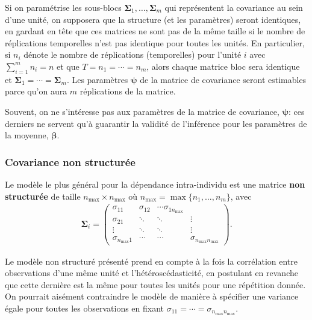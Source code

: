 \documentclass[
  11pt,
  letterpaper,
]{article}
\theoremstyle{definition}
\theoremstyle{definition}
\theoremstyle{definition}
\theoremstyle{definition}
\theoremstyle{remark}
\begin{document}
Si on paramétrise les sous-blocs \(\boldsymbol{\Sigma}_1, \ldots, \boldsymbol{\Sigma}_m\) qui représentent la covariance au sein d'une unité, on supposera que la structure (et les paramètres) seront identiques, en gardant en tête que ces matrices ne sont pas de la même taille si le nombre de réplications temporelles n'est pas identique pour toutes les unités. En particulier, si \(n_i\) dénote le nombre de réplications (temporelles) pour l'unité \(i\) avec \(\sum_{i=1}^m n_i=n\) et que \(T=n_1 = \cdots = n_m\), alors chaque matrice bloc sera identique et \(\boldsymbol{\Sigma}_1 = \cdots =\boldsymbol{\Sigma}_m\). Les paramètres \(\boldsymbol{\psi}\) de la matrice de covariance seront estimables parce qu'on aura \(m\) réplications de la matrice.

Souvent, on ne s'intéresse pas aux paramètres de la matrice de covariance, \(\boldsymbol{\psi}\): ces derniers ne servent qu'à guarantir la validité de l'inférence pour les paramètres de la moyenne, \(\boldsymbol{\beta}\).

\hypertarget{covariance-non-structuruxe9e}{%
\subsubsection{Covariance non structurée}\label{covariance-non-structuruxe9e}}

Le modèle le plus général pour la dépendance intra-individu est une matrice \textbf{non structurée} de taille \(n_{\max} \times n_{\max}\) où \(n_{\max} = \max\{n_1, \ldots, n_m\}\), avec
\begin{align*}
\boldsymbol{\Sigma}_i = \begin{pmatrix}
\sigma_{11} & \sigma_{12} &\cdots \sigma_{1n_{\max}} \\
\sigma_{21} & \ddots & \ddots & \vdots \\
\vdots &  \ddots & \ddots & \vdots \\
\sigma_{n_{\max}1} & \cdots & \cdots & \sigma_{n_{\max}n_{\max}}
\end{pmatrix}.
\end{align*}

Le modèle non structuré présenté prend en compte à la fois la corrélation entre observations d'une même unité et l'hétéroscédasticité, en postulant en revanche que cette dernière est la même pour toutes les unités pour une répétition donnée. On pourrait aisément contraindre le modèle de manière à spécifier une variance égale pour toutes les observations en fixant \(\sigma_{11} = \cdots = \sigma_{n_{\max}n_{\max}}\).
\end{document}
